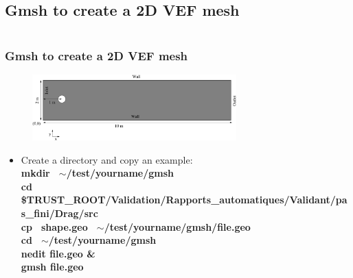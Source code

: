 \documentclass[10pt]{beamer}
\begin{document}
\subsection{Gmsh to create a 2D VEF mesh}
\begin{frame}
\begin{columns}[c] 
\tableofcontents[sections={1-6},currentsection, currentsubsection]
\tableofcontents[sections={7-12},currentsection, currentsubsection]
\end{columns}
\end{frame}
\begin{frame}
\frametitle{Gmsh to create a 2D VEF mesh}
\begin{block}{}

\begin{figure}
\includegraphics[width=0.7\textwidth]{PICTURES/gmsh.pdf}
\end{figure}

\begin{itemize}
\item Create a directory and copy an example:\\
{\footnotesize{
\textbf{mkdir \, $\sim$/test/yourname/gmsh} \\
\textbf{cd \, \$TRUST\_ROOT/Validation/Rapports\_automatiques/Validant/pas\_fini/Drag/src} \\
\textbf{cp \, shape.geo \, $\sim$/test/yourname/gmsh/file.geo} \\
\textbf{cd \, $\sim$/test/yourname/gmsh} \\
\textbf{nedit file.geo \& } \\
\textbf{gmsh file.geo} }}\\
\end{itemize}

\end{block}
\end{frame}
\end{document}
